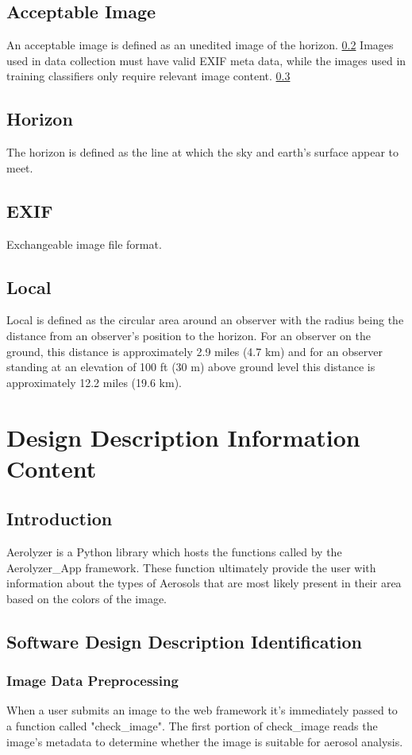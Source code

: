 \documentclass[onecolumn, draftclsnofoot,10pt, compsoc]{IEEEtran}
\begin{document}
\begin{singlespace}
	\subsection{Acceptable Image}\label{def:accImg}
		An acceptable image is defined as an unedited image of the horizon. \ref{def:horizon}
		Images used in data collection must have valid EXIF meta data, while the images used in training classifiers only require relevant image content. \ref{def:exif}
	
	\subsection{Horizon}\label{def:horizon}
		The horizon is defined as the line at which the sky and earth's surface appear to meet.
	
	\subsection{EXIF}\label{def:exif}
		Exchangeable image file format.
	
	\subsection{Local}\label{def:local}
		Local is defined as the circular area around an observer with the radius being the distance from an observer's position to the horizon.
		For an observer on the ground, this distance is approximately 2.9 miles (4.7 km) and for an observer standing at an elevation of 100 ft (30 m) above ground level this distance is approximately 12.2 miles (19.6 km).

\section{Design Description Information Content}
	\subsection{Introduction}
		Aerolyzer is a Python library which hosts the functions called by the Aerolyzer\_App framework.
		These function ultimately provide the user with information about the types of Aerosols that are most likely present in their area based on the colors of the image.
    \subsection{Software Design Description Identification}
    	\subsubsection{Image Data Preprocessing}
        When a user submits an image to the web framework it's immediately passed to a function called "check\_image".
		The first portion of check\_image reads the image's metadata to determine whether the image is suitable for aerosol analysis.

\end{singlespace}
\end{document}

